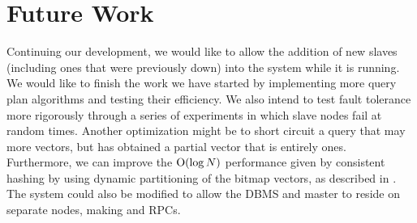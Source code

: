 \section{Future Work}
Continuing our development, we would like to allow the addition of new slaves
(including ones that were previously down) into the system while it is running.
We would like to finish the work we have started by implementing more
query plan algorithms and testing their efficiency. We also intend to test
fault tolerance more rigorously through a series of experiments in which
slave nodes fail at random times. Another optimization might be to short
circuit a query that may  more vectors, but has obtained a partial
vector that is entirely ones. Furthermore, we can improve the
\(\mathrm{O}(\log{N})\) performance given by consistent hashing by using dynamic
partitioning of the bitmap vectors, as described in \cite{kleppmann2017}.
The system could also be modified to allow the DBMS and master to reside on separate nodes, making
 and  RPCs.
